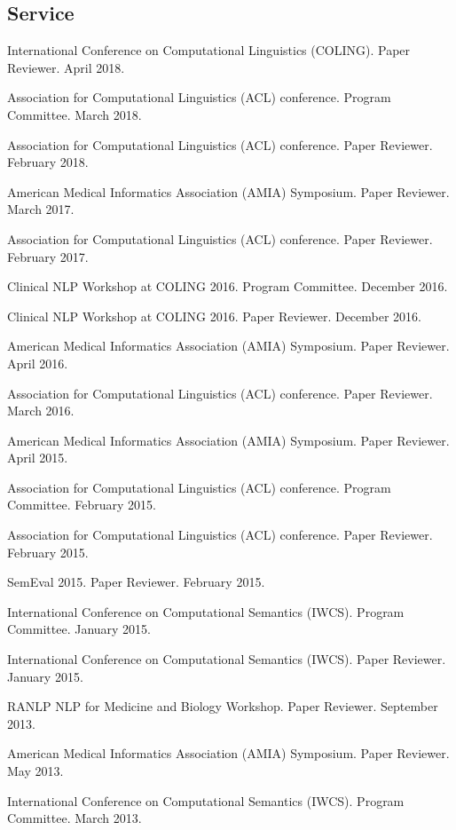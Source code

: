 \documentclass[letterpaper]{article}
\renewenvironment{itemize}{
  \begin{list}{}{
    \setlength{\leftmargin}{1.5em}
  }
}{
  \end{list}
}
\begin{document}
\subsection*{Service}

\begin{itemize}
\item International Conference on Computational Linguistics (COLING). Paper Reviewer. April 2018.
\item Association for Computational Linguistics (ACL) conference. Program Committee. March 2018.
\item Association for Computational Linguistics (ACL) conference. Paper Reviewer. February 2018.
\item American Medical Informatics Association (AMIA) Symposium. Paper Reviewer. March 2017.
\item Association for Computational Linguistics (ACL) conference. Paper Reviewer. February 2017.
\item Clinical NLP Workshop at COLING 2016. Program Committee. December 2016.
\item Clinical NLP Workshop at COLING 2016. Paper Reviewer. December 2016.
\item American Medical Informatics Association (AMIA) Symposium. Paper Reviewer. April 2016.
\item Association for Computational Linguistics (ACL) conference. Paper Reviewer. March 2016.
\item American Medical Informatics Association (AMIA) Symposium. Paper Reviewer. April 2015.
\item Association for Computational Linguistics (ACL) conference. Program Committee. February 2015.
\item Association for Computational Linguistics (ACL) conference. Paper Reviewer. February 2015.
\item SemEval 2015. Paper Reviewer. February 2015.
\item International Conference on Computational Semantics (IWCS). Program Committee. January 2015.
\item International Conference on Computational Semantics (IWCS). Paper Reviewer. January 2015.
\item RANLP NLP for Medicine and Biology Workshop. Paper Reviewer. September 2013.
\item American Medical Informatics Association (AMIA) Symposium. Paper Reviewer. May 2013.
\item International Conference on Computational Semantics (IWCS). Program Committee. March 2013.

\end{itemize}
\end{document}
